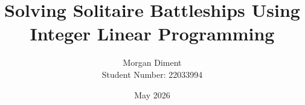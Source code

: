

\usepackage{tabularray}      %
\usepackage{booktabs}        %
\usepackage{longtable}       %

\usepackage{mathtools}       %
\usepackage{pifont}          %
\usepackage{siunitx}         %
\usepackage{relsize}         %
\usepackage[version=4]{mhchem} %

\usepackage{float}           %
\usepackage{stfloats}        %
\usepackage{subcaption}      %
\usepackage{rotating}        %

\usepackage{algorithm}       %
\usepackage[noend]{algpseudocode}

\usepackage{enumitem}        %
\usepackage{verbatim}        %
\usepackage{afterpage}       %

\title{Solving Solitaire Battleships Using Integer Linear Programming}
\author{Morgan Diment 

Student Number: 22033994}
\date{May 2026}

